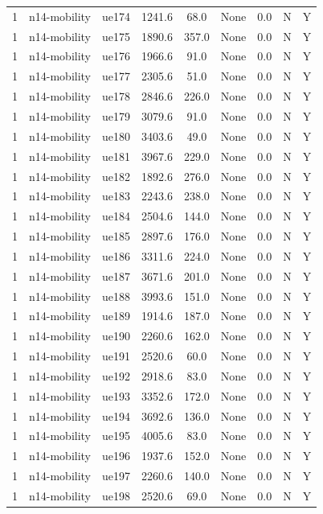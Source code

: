 \begin{table}[ht]
\begin{tabular}{|c|c|c|c|c|c|c|c|c|}
1 & n14-mobility & ue174 & 1241.6 & 68.0 & None & 0.0 & N & Y \\
1 & n14-mobility & ue175 & 1890.6 & 357.0 & None & 0.0 & N & Y \\
1 & n14-mobility & ue176 & 1966.6 & 91.0 & None & 0.0 & N & Y \\
1 & n14-mobility & ue177 & 2305.6 & 51.0 & None & 0.0 & N & Y \\
1 & n14-mobility & ue178 & 2846.6 & 226.0 & None & 0.0 & N & Y \\
1 & n14-mobility & ue179 & 3079.6 & 91.0 & None & 0.0 & N & Y \\
1 & n14-mobility & ue180 & 3403.6 & 49.0 & None & 0.0 & N & Y \\
1 & n14-mobility & ue181 & 3967.6 & 229.0 & None & 0.0 & N & Y \\
1 & n14-mobility & ue182 & 1892.6 & 276.0 & None & 0.0 & N & Y \\
1 & n14-mobility & ue183 & 2243.6 & 238.0 & None & 0.0 & N & Y \\
1 & n14-mobility & ue184 & 2504.6 & 144.0 & None & 0.0 & N & Y \\
1 & n14-mobility & ue185 & 2897.6 & 176.0 & None & 0.0 & N & Y \\
1 & n14-mobility & ue186 & 3311.6 & 224.0 & None & 0.0 & N & Y \\
1 & n14-mobility & ue187 & 3671.6 & 201.0 & None & 0.0 & N & Y \\
1 & n14-mobility & ue188 & 3993.6 & 151.0 & None & 0.0 & N & Y \\
1 & n14-mobility & ue189 & 1914.6 & 187.0 & None & 0.0 & N & Y \\
1 & n14-mobility & ue190 & 2260.6 & 162.0 & None & 0.0 & N & Y \\
1 & n14-mobility & ue191 & 2520.6 & 60.0 & None & 0.0 & N & Y \\
1 & n14-mobility & ue192 & 2918.6 & 83.0 & None & 0.0 & N & Y \\
1 & n14-mobility & ue193 & 3352.6 & 172.0 & None & 0.0 & N & Y \\
1 & n14-mobility & ue194 & 3692.6 & 136.0 & None & 0.0 & N & Y \\
1 & n14-mobility & ue195 & 4005.6 & 83.0 & None & 0.0 & N & Y \\
1 & n14-mobility & ue196 & 1937.6 & 152.0 & None & 0.0 & N & Y \\
1 & n14-mobility & ue197 & 2260.6 & 140.0 & None & 0.0 & N & Y \\
1 & n14-mobility & ue198 & 2520.6 & 69.0 & None & 0.0 & N & Y \\

\end{tabular}
\end{table}
